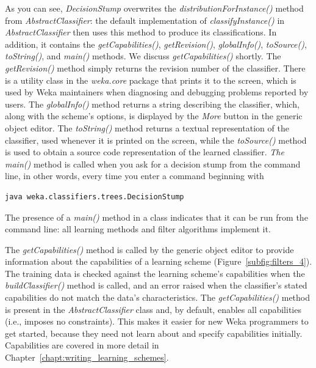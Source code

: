 As you can see, \textit{DecisionStump} overwrites
the \textit{distributionForInstance()} method
from \textit{AbstractClassifier}: the default implementation
of \textit{classifyInstance()} in \textit{AbstractClassifier} then
uses this method to produce its classifications. In addition, it
contains the \textit{getCapabilities()}, \textit{getRevision()}, \textit{globalInfo()},
\textit{toSource()}, \textit{toString()}, and \textit{main()} methods. We discuss
\textit{getCapabilities()} shortly. The \textit{getRevision()} method simply returns the
revision number of the classifier. There is a utility class in the
\textit{weka.core} package that prints it to the screen, which is used by Weka
maintainers when diagnosing and debugging problems reported by
users. The \textit{globalInfo()} method returns a string describing the
classifier, which, along with the scheme's options, is displayed by
the \textit{More} button in the generic object editor. The
\textit{toString()} method returns a textual representation of the classifier,
used whenever it is printed on the screen, while
the \textit{toSource()} method is used to obtain a source code
representation of the learned classifier. \textit{The main()} method is called
when you ask for a decision stump from the command line, in other
words, every time you enter a command beginning with

\begin{Verbatim}[fontsize=\footnotesize]
java weka.classifiers.trees.DecisionStump
\end{Verbatim}

\noindent The presence of a \textit{main()} method in a class indicates that it
can be run from the command line: all learning methods and filter
algorithms implement it.

The \textit{getCapabilities()} method is called by the generic object
editor to provide information about the capabilities of a learning
scheme (Figure~\ref{subfig:filters_4}). The training data is checked
against the learning scheme’s capabilities when
the \textit{buildClassifier()} method is called, and an error raised
when the classifier’s stated capabilities do not match the data's
characteristics. The \textit{getCapabilities()} method is present in
the \textit{AbstractClassifier} class and, by default, enables all
capabilities (i.e., imposes no constraints). This makes it easier for
new Weka programmers to get started, because they need not learn about
and specify capabilities initially. Capabilities are covered in more
detail in Chapter~\ref{chapt:writing_learning_schemes}.

